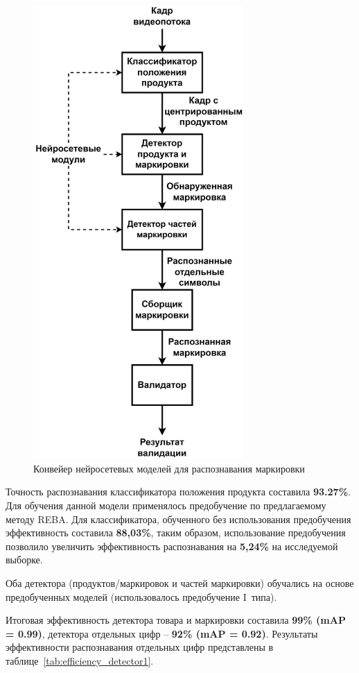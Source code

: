 \documentclass{thesisby}
\begin{document}
\begin{figure}[!ht]
	\centering
	\includegraphics[width=8cm]{man-source/images/ch4/savushkin_structure.png}
	\caption{Конвейер нейросетевых моделей для распознавания маркировки}
	\label{fig:general_diagram}
\end{figure}

Точность распознавания классификатора положения продукта составила \textbf{93.27\%}. Для обучения данной модели применялось предобучение по предлагаемому методу REBA.
Для классификатора, обученного без использования предобучения эффективность составила \textbf{88,03\%}, таким образом, использование предобучения позволило увеличить эффективность распознавания на \textbf{5,24\%} на исследуемой выборке.

Оба детектора (продуктов/маркировок и частей маркировки) обучались на основе предобученных моделей (использовалось предобучение I~типа).

Итоговая эффективность детектора товара и маркировки составила \textbf{99\% (mAP = 0.99)}, детектора отдельных цифр -- \textbf{92\% (mAP = 0.92)}. Результаты эффективности распознавания отдельных цифр представлены в таблице~\ref{tab:efficiency_detector1}.  
\end{document}
